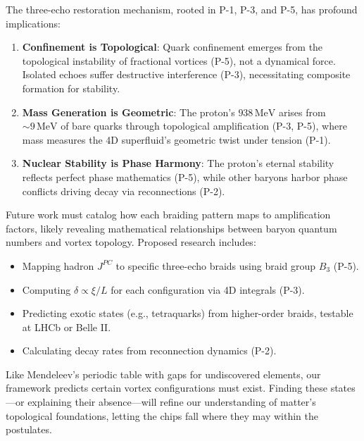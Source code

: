 The three-echo restoration mechanism, rooted in P-1, P-3, and P-5, has profound implications:

\begin{enumerate}
\item \textbf{Confinement is Topological}: Quark confinement emerges from the topological instability of fractional vortices (P-5), not a dynamical force. Isolated echoes suffer destructive interference (P-3), necessitating composite formation for stability.
\item \textbf{Mass Generation is Geometric}: The proton's $938 \, \text{MeV}$ arises from $\sim 9 \, \text{MeV}$ of bare quarks through topological amplification (P-3, P-5), where mass measures the 4D superfluid's geometric twist under tension (P-1).
\item \textbf{Nuclear Stability is Phase Harmony}: The proton's eternal stability reflects perfect phase mathematics (P-5), while other baryons harbor phase conflicts driving decay via reconnections (P-2).
\end{enumerate}

Future work must catalog how each braiding pattern maps to amplification factors, likely revealing mathematical relationships between baryon quantum numbers and vortex topology. Proposed research includes:

\begin{itemize}
\item Mapping hadron $J^{PC}$ to specific three-echo braids using braid group $B_3$ (P-5).
\item Computing $\delta \propto \xi/L$ for each configuration via 4D integrals (P-3).
\item Predicting exotic states (e.g., tetraquarks) from higher-order braids, testable at LHCb or Belle II.
\item Calculating decay rates from reconnection dynamics (P-2).
\end{itemize}

Like Mendeleev's periodic table with gaps for undiscovered elements, our framework predicts certain vortex configurations must exist. Finding these states—or explaining their absence—will refine our understanding of matter's topological foundations, letting the chips fall where they may within the postulates.


